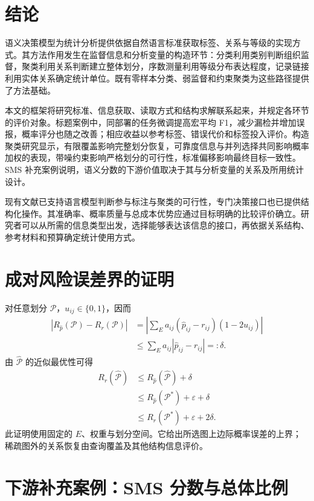 \documentclass[UTF8,a4paper,zihao=-4,fontset=fandol]{ctexart}
\begin{document}
\section{结论}\label{sec:conclusion}

语义决策模型为统计分析提供依据自然语言标准获取标签、关系与等级的实现方式。其方法作用发生在监督信息和分析变量的构造环节：分类利用类别判断组织监督，聚类利用关系判断建立整体划分，序数测量利用等级分布表达程度，记录链接利用实体关系确定统计单位。既有零样本分类、弱监督和约束聚类为这些路径提供了方法基础。

本文的框架将研究标准、信息获取、读取方式和结构求解联系起来，并规定各环节的评价对象。标题案例中，同部署的任务微调提高宏平均 F1，减少漏检并增加误报，概率评分也随之改善；相应收益以参考标签、错误代价和标签投入评价。构造聚类研究显示，有限覆盖影响完整划分恢复，可靠度信息与并列选择共同影响概率加权的表现，带噪约束影响严格划分的可行性，标准偏移影响最终目标一致性。SMS 补充案例说明，语义分数的下游价值取决于其与分析变量的关系及所用统计设计。

现有文献已支持语言模型判断参与标注与聚类的可行性，专门决策接口也已提供结构化操作。其准确率、概率质量与总成本优势应通过目标明确的比较评价确立。研究者可以从所需的信息类型出发，选择能够表达该信息的接口，再依据关系结构、参考材料和预算确定统计使用方式。

\appendix
\section{成对风险误差界的证明}\label{app:bound}

对任意划分 $\mathcal P$，$u_{ij}\in\{0,1\}$，因而
\begin{align}
 |R_{\widehat p}(\mathcal P)-R_r(\mathcal P)|
 &=\left|\sum_E a_{ij}(\widehat p_{ij}-r_{ij})(1-2u_{ij})\right|\\
 &\leq\sum_E a_{ij}|\widehat p_{ij}-r_{ij}|=:\delta.
\end{align}
由 $\widehat{\mathcal P}$ 的近似最优性可得
\begin{align}
 R_r(\widehat{\mathcal P})
 &\leq R_{\widehat p}(\widehat{\mathcal P})+\delta\\
 &\leq R_{\widehat p}(\mathcal P^*)+\varepsilon+\delta\\
 &\leq R_r(\mathcal P^*)+\varepsilon+2\delta.
\end{align}
此证明使用固定的 $E$、权重与划分空间。它给出所选图上边际概率误差的上界；稀疏图外的关系恢复由查询覆盖及其他结构信息评价。

\section{下游补充案例：SMS 分数与总体比例}\label{sec:sms}
\end{document}
